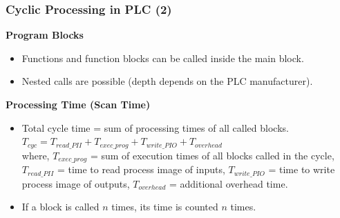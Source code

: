 \begin{frame}
	\frametitle{Cyclic Processing in PLC (2)}
	\textbf{Program Blocks}
	\begin{itemize}
		\item Functions and function blocks can be called inside the main block.
		\item Nested calls are possible (depth depends on the PLC manufacturer).
	\end{itemize}
	\vspace{0.3cm}
	\textbf{Processing Time (Scan Time)}
	\begin{itemize}
		\item Total cycle time = sum of processing times of all called blocks. \\
		$T_{cyc} = T_{read\_PII} + T_{exec\_prog} + T_{write\_PIO} + T_{overhead}$ \\
		where, $T_{exec\_prog}$ = sum of execution times of all blocks called in the cycle, $T_{read\_PII}$ = time to read process image of inputs, $T_{write\_PIO}$ = time to write process image of outputs, $T_{overhead}$ = additional overhead time.
		\item If a block is called $n$ times, its time is counted $n$ times.
	\end{itemize}
\end{frame}

